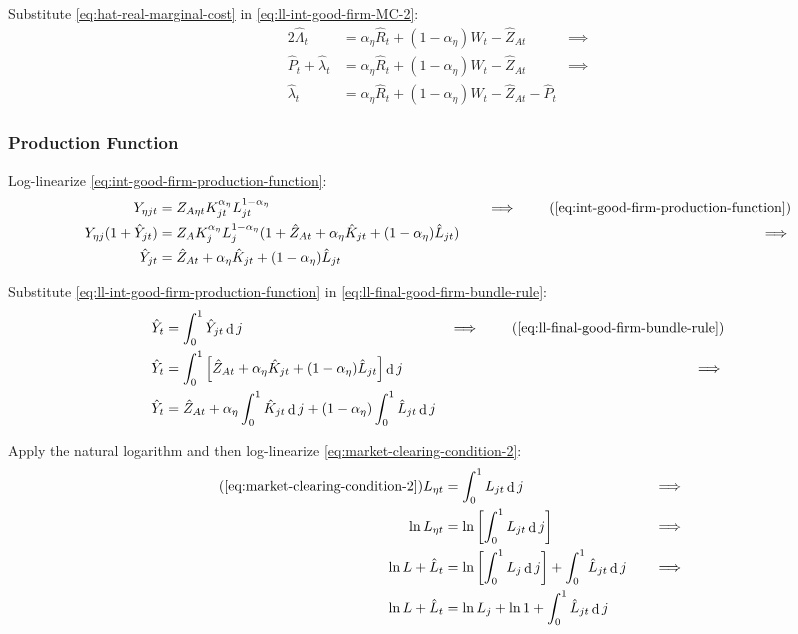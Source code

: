\documentclass[
	12pt,
	]{article}
\numberwithin{equation}{section}
\DeclareMathOperator{\dif}{d}
\theoremstyle{definition}
\theoremstyle{plain}
\theoremstyle{plain}
\theoremstyle{plain}
\begin{document}
Substitute \ref{eq:hat-real-marginal-cost} in \ref{eq:ll-int-good-firm-MC-2}:
\begin{alignat}{2}
	\hat{\Lambda}_t &= {\alpha_\eta} \hat{R}_t + (1- {\alpha_\eta}) \hat{W}_t - \hat{Z}_{At} &\implies \nonumber \\
	\hat{P}_t + \hat{\lambda}_t &= {\alpha_\eta} \hat{R}_t + (1- {\alpha_\eta}) \hat{W}_t - \hat{Z}_{At} &\implies \nonumber \\
	\hat{\lambda}_t &= {\alpha_\eta} \hat{R}_t + (1- {\alpha_\eta}) \hat{W}_t - \hat{Z}_{At} - \hat{P}_t \label{eq:ll-int-good-firm-MC-3}
\end{alignat}


\subsubsection{Production Function}

Log-linearize \ref{eq:int-good-firm-production-function}:
\begin{alignat}{2}
	Y_{\eta jt} &= Z_{A\eta t} K_{jt}^{\alpha_\eta} L_{jt}^{1-{\alpha_\eta}} &\implies \tag{\ref{eq:int-good-firm-production-function}} \\
	Y_{\eta j} (1+ \hat{Y}_{jt}) &= Z_{A} K_{j}^{\alpha_\eta} L_{j}^{1-{\alpha_\eta}} (1+ \hat{Z}_{At} + {\alpha_\eta} \hat{K}_{jt} + (1-{\alpha_\eta}) \hat{L}_{jt}) \quad &\implies \nonumber \\
	\hat{Y}_{jt} &= \hat{Z}_{At} + {\alpha_\eta} \hat{K}_{jt} + (1-{\alpha_\eta}) \hat{L}_{jt} \label{eq:ll-int-good-firm-production-function}
\end{alignat}

Substitute \ref{eq:ll-int-good-firm-production-function} in \ref{eq:ll-final-good-firm-bundle-rule}:
\begin{alignat}{2}
	\hat{Y}_t &= \int_{0}^{1} \hat{Y}_{jt} \dif j &\implies \tag{\ref{eq:ll-final-good-firm-bundle-rule}} \\
	\hat{Y}_t &= \int_{0}^{1} \left[ \hat{Z}_{At} + {\alpha_\eta} \hat{K}_{jt} + (1-{\alpha_\eta}) \hat{L}_{jt} \right] \dif j &\implies \nonumber \\
	\hat{Y}_t &= \hat{Z}_{At} + {\alpha_\eta} \int_{0}^{1} \hat{K}_{jt} \dif j + (1-{\alpha_\eta}) \int_{0}^{1} \hat{L}_{jt} \dif j \label{eq:ll-final-good-firm-bundle-rule-2}
\end{alignat}

Apply the natural logarithm and then log-linearize \ref{eq:market-clearing-condition-2}:
\begin{alignat}{2}
	\tag{\ref{eq:market-clearing-condition-2}}
	L_{\eta t} &= \int_{0}^{1} L_{jt} \dif j &\implies \\
	\ln L_{\eta t} &= \ln \left[ \int_{0}^{1} L_{jt} \dif j \right] &\implies \nonumber \\
	\ln L + \hat{L}_t &= \ln \left[ \int_{0}^{1} L_{j} \dif j \right] + \int_{0}^{1} \hat{L}_{jt} \dif j \quad &\implies \nonumber \\
	\ln L + \hat{L}_t &= \ln L_{j} + \ln 1 + \int_{0}^{1} \hat{L}_{jt} \dif j \nonumber
\end{alignat}
\end{document}
